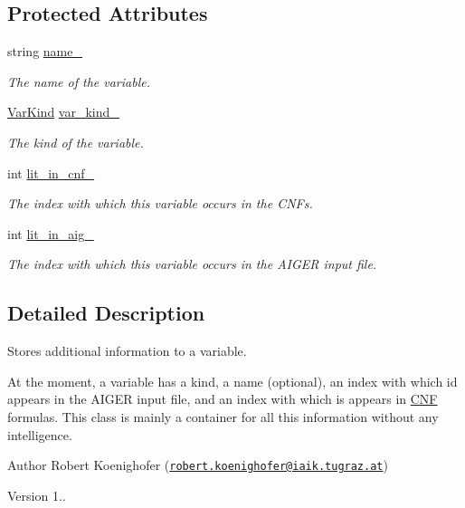 \subsection*{Protected Attributes}
\begin{DoxyCompactItemize}
\item 
string \hyperlink{classVarInfo_a82a85d0c811c2e5501401bd42463371b}{name\-\_\-}
\begin{DoxyCompactList}\small\item\em The name of the variable. \end{DoxyCompactList}\item 
\hyperlink{classVarInfo_a64d1da76cf84fe674e5fef9764ef11cf}{Var\-Kind} \hyperlink{classVarInfo_aabed2d542c10abb83514e4592913b431}{var\-\_\-kind\-\_\-}
\begin{DoxyCompactList}\small\item\em The kind of the variable. \end{DoxyCompactList}\item 
int \hyperlink{classVarInfo_aa9937f8bae554d520b194c4d97df4b64}{lit\-\_\-in\-\_\-cnf\-\_\-}
\begin{DoxyCompactList}\small\item\em The index with which this variable occurs in the C\-N\-Fs. \end{DoxyCompactList}\item 
int \hyperlink{classVarInfo_ae0bf3d35787614131a642bea83d30555}{lit\-\_\-in\-\_\-aig\-\_\-}
\begin{DoxyCompactList}\small\item\em The index with which this variable occurs in the A\-I\-G\-E\-R input file. \end{DoxyCompactList}\end{DoxyCompactItemize}


\subsection{Detailed Description}
Stores additional information to a variable. 

At the moment, a variable has a kind, a name (optional), an index with which id appears in the A\-I\-G\-E\-R input file, and an index with which is appears in \hyperlink{classCNF}{C\-N\-F} formulas. This class is mainly a container for all this information without any intelligence.

\begin{DoxyAuthor}{Author}
Robert Koenighofer (\href{mailto:robert.koenighofer@iaik.tugraz.at}{\tt robert.\-koenighofer@iaik.\-tugraz.\-at}) 
\end{DoxyAuthor}
\begin{DoxyVersion}{Version}
1.. 
\end{DoxyVersion}


